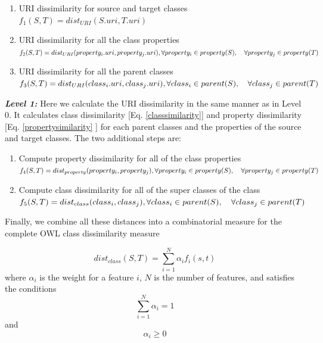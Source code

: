 \documentclass{IOS-Book-Article}
\begin{document}
\begin{enumerate}

\item URI dissimilarity for source and target classes 
\\ $f_1(S, T) = dist_{URI}(S.{uri},T.{uri})$  

\item URI dissimilarity for all the class properties
\\$f_2(S, T) = dist_{URI}(property_i.{uri},property_j.{uri}), 
\\\forall property_i \in property(S),\quad\forall property_j \in property(T) $

\item URI dissimilarity for all the parent classes
\\$f_3(S, T) = dist_{URI}(class_i.{uri},class_j.{uri}), 
\\\forall class_i \in parent(S),\quad \forall class_j \in parent(T) $

\end{enumerate}

\indent \textit{\textbf{Level 1:}} Here we calculate the URI dissimilarity in the same manner as in Level 0. It calculates class dissimilarity [Eq. \eqref{classsimilarity}] and property dissimilarity [Eq. \eqref{propertysimilarity} ] for each parent classes and the properties of the source and target classes.  The two additional steps are:
\begin{enumerate}

\item Compute property dissimilarity for all of the class properties 
\\$f_4(S, T) = dist_{property}(property_i,property_j), 
\\ \forall property_i \in property(S),\quad \forall property_j \in property(T) $ 

\item Compute class dissimilarity for all of the super classes of the class 
\\$f_5(S, T) = dist_{class}(class_i,class_j),
\\\forall class_i \in parent(S),\quad\forall class_j \in parent(T) $

\end{enumerate}

\indent Finally, we combine all these distances into a combinatorial measure for the complete OWL class dissimilarity measure

\begin{equation}
\label{classsimilarity}
dist_{class}(S, T)= \sum_{i=1}^N {{\alpha}_i f_i(s, t)}
\end{equation}
\noindent where ${\alpha}_i$ is the weight for a feature $i$, $N$ is the number of features, and satisfies the conditions
\begin{equation}
\label{alphaconstraint1}
\sum_{i=1}^{N} {{\alpha}_i} = 1
\end{equation}
\noindent and 
\begin{equation}
\label{alphaconstraint2}
{\alpha}_i \geq 0  
\end{equation}
\end{document}
